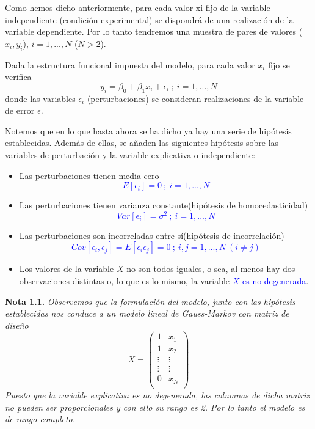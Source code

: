 \documentclass[10pt,a4paper]{book}
\begin{document}
Como hemos dicho anteriormente, para cada valor xi fijo de la variable independiente (condición experimental) se dispondrá de una realización de la variable dependiente. Por lo tanto tendremos una muestra de pares de valores ($x_i,y_i$), $i=1,...,N$ ($N > 2$).

Dada la estructura funcional impuesta del modelo, para cada valor $x_i$ fijo se verifica $$y_i=\beta_0 + \beta_1x_i + \epsilon_i\ ;\ i=1,...,N$$ donde las variables $\epsilon_i$ (perturbaciones) se consideran realizaciones de la variable de error $\epsilon$.

Notemos que en lo que hasta ahora se ha dicho ya hay una serie de hipótesis establecidas. Además de ellas, se añaden las siguientes hipótesis sobre las variables de perturbación y la variable explicativa o independiente:
\begin{itemize}
\item Las perturbaciones tienen media cero \textcolor{blue}{$$E[\epsilon_i]=0\ ;\ i=1,...,N$$}
\item Las perturbaciones tienen varianza constante(hipótesis de homocedasticidad)\textcolor{blue}{$$Var[\epsilon_i]=\sigma^2\ ;\ i=1,...,N$$}
\item Las perturbaciones son incorreladas entre sí(hipótesis de incorrelación) \textcolor{blue}{$$Cov[\epsilon_i,\epsilon_j]=E[\epsilon_i\epsilon_j]=0\ ;\ i,j=1,...,N\ (i\neq j)$$}
\item Los valores de la variable $X$ no son todos iguales, o sea, al menos hay dos observaciones distintas o, lo que es lo mismo, la variable \textcolor{blue}{$X$ es no degenerada}.
\end{itemize}

\textbf{Nota 1.1.} \textit{Observemos que la formulación del modelo, junto con las hipótesis establecidas nos conduce a un modelo lineal de Gauss-Markov con matriz de diseño} $$X=\left( \begin{array}{cc}
1 & x_1\\
1 & x_2\\
\vdots & \vdots\\
\vdots & \vdots\\
0 & x_N\\
\end{array} \right)$$
\textit{Puesto que la variable explicativa es no degenerada, las columnas de dicha matriz no pueden ser proporcionales y con ello su rango es 2. Por lo tanto el modelo es de rango completo.}
\ \\
\end{document}

